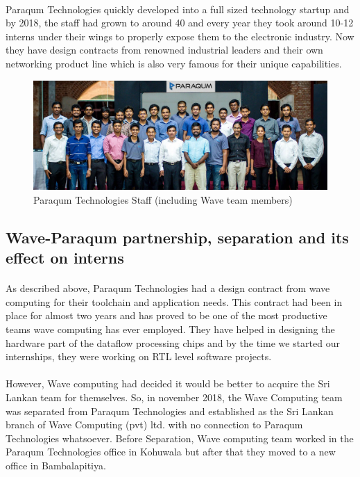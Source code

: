 \paragraph{}
Paraqum Technologies quickly developed into a full sized technology startup and by 2018, the staff had grown to around 40 and every year they took around 10-12 interns under their wings to properly expose them to the electronic industry. Now they have design contracts from renowned industrial leaders and their own networking product line which is also very famous for their unique capabilities.

\begin{figure}[h]
    \centering
    \includegraphics[trim=0cm 0cm 0cm 0cm, clip=true,scale=0.25]{figures/paraqum_team.jpg}
    \caption{Paraqum Technologies Staff (including Wave team members)~\cite{pqmintro} \label{Fig:pqmteam}}\vspace{-4mm}
    \end{figure}

\subsection{Wave-Paraqum partnership, separation and its effect on interns}

\paragraph{}
As described above, Paraqum Technologies had a design contract from wave computing for their toolchain and application needs. This contract had been in place for almost two years and has proved to be one of the most productive teams wave computing has ever employed. They have helped in designing the hardware part of the dataflow processing chips and by the time we started our internships, they were working on RTL level software projects.

\paragraph{}
However, Wave computing had decided it would be better to acquire the Sri Lankan team for themselves. So, in november 2018, the Wave Computing team was separated from Paraqum Technologies and established as the Sri Lankan branch of Wave Computing (pvt) ltd. with no connection to Paraqum Technologies whatsoever. Before Separation, Wave computing team worked in the Paraqum Technologies office in Kohuwala but after that they moved to a new office in Bambalapitiya.

